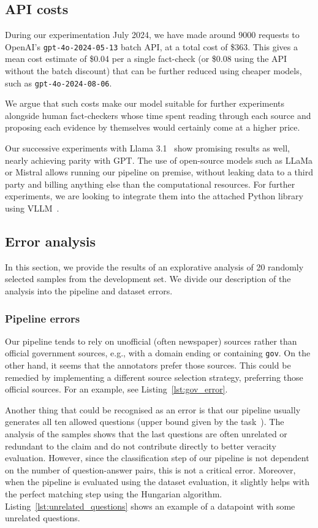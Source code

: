 \subsection{API costs}
During our experimentation July 2024, we have made around 9000 requests to OpenAI's \texttt{gpt-4o-2024-05-13} batch API, at a total cost of \$363.
This gives a mean cost estimate of \$0.04 per a single fact-check (or \$0.08 using the API without the batch discount) that can be further reduced using cheaper models, such as \texttt{gpt-4o-2024-08-06}.

We argue that such costs make our model suitable for further experiments alongside human fact-checkers whose time spent reading through each source and proposing each evidence by themselves would certainly come at a higher price.

Our successive experiments with Llama 3.1~\cite{dubey2024llama3herdmodels} show promising results as well, nearly achieving parity with GPT.
The use of open-source models such as LLaMa or Mistral allows running our pipeline on premise, without leaking data to a third party and billing anything else than the computational resources.
For further experiments, we are looking to integrate them into the attached Python library using VLLM~\cite{vllm}.

\subsection{Error analysis}
In this section, we provide the results of an explorative analysis of 20 randomly selected samples from the development set. We divide our description of the analysis into the pipeline and dataset errors.


\subsubsection{Pipeline errors}
Our pipeline tends to rely on unofficial (often newspaper) sources rather than official government sources, e.g., with a domain ending or containing \texttt{gov}. On the other hand, it seems that the annotators prefer those sources. This could be remedied by implementing a different source selection strategy, preferring those official sources. For an example, see Listing~\ref{lst:gov_error}.

Another thing that could be recognised as an error is that our pipeline usually generates all ten allowed questions (upper bound given by the task~\cite{averitec2024}). The analysis of the samples shows that the last questions are often unrelated or redundant to the claim and do not contribute directly to better veracity evaluation. However, since the classification step of our pipeline is not dependent on the number of question-answer pairs, this is not a critical error. Moreover, when the pipeline is evaluated using the \averitec{} dataset evaluation, it slightly helps with the perfect matching step using the Hungarian algorithm. Listing~\ref{lst:unrelated_questions} shows an example of a datapoint with some unrelated questions.

